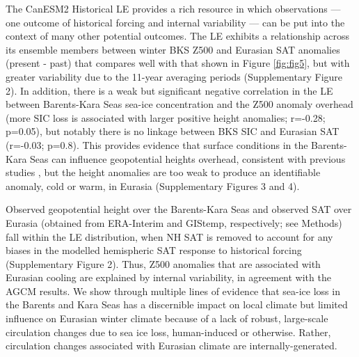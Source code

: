 \documentclass{nature}
\begin{document}
The CanESM2 Historical LE provides a rich resource in which observations --- one outcome of historical forcing and internal variability --- can be put into the context of many other potential outcomes. The LE exhibits a relationship across its ensemble members between winter BKS Z500 and Eurasian SAT anomalies (present - past) that compares well with that shown in Figure \ref{fig:fig5}, but with greater variability due to the 11-year averaging periods (Supplementary Figure 2). In addition, there is a weak but significant negative correlation in the LE between Barents-Kara Seas sea-ice concentration and the Z500 anomaly overhead (more SIC loss is associated with larger positive height anomalies; r=-0.28; p=0.05), but notably there is no linkage between BKS SIC and Eurasian SAT (r=-0.03; p=0.8). This provides evidence that surface conditions in the Barents-Kara Seas can influence geopotential heights overhead, consistent with previous studies \cite{honda09,mori14}, but the height anomalies are too weak to produce an identifiable anomaly, cold or warm, in Eurasia (Supplementary Figures 3 and 4). 

Observed geopotential height over the Barents-Kara Seas and observed SAT over Eurasia (obtained from ERA-Interim and GIStemp, respectively; see Methods) fall within the LE distribution, when NH SAT is removed to account for any biases in the modelled hemispheric SAT response to historical forcing (Supplementary Figure 2). Thus, Z500 anomalies that are associated with Eurasian cooling are explained by internal variability, in agreement with the AGCM results. We show through multiple lines of evidence that sea-ice loss in the Barents and Kara Seas has a discernible impact on local climate but limited influence on Eurasian winter climate because of a lack of robust, large-scale circulation changes due to sea ice loss, human-induced or otherwise. Rather, circulation changes associated with Eurasian climate are internally-generated.  





\end{document}
